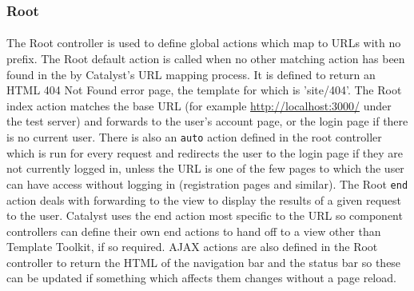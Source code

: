 \subsubsection{Root}
\label{sec:controller_root}

\paragraph{}
The Root controller is used to define global actions which map to URLs with no prefix. The Root default action is called when no other matching action has been found in the by Catalyst's URL mapping process. It is defined to return an HTML 404 Not Found error page, the template for which is 'site/404'. The Root index action matches the base URL (for example \url{http://localhost:3000/} under the test server) and forwards to the user's account page, or the login page if there is no current user. There is also an \texttt{auto} action defined in the root controller which is run for every request and redirects the user to the login page if they are not currently logged in, unless the URL is one of the few pages to which the user can have access without logging in (registration pages and similar). The Root \texttt{end} action deals with forwarding to the view to display the results of a given request to the user. Catalyst uses the end action most specific to the URL so component controllers can define their own end actions to hand off to a view other than Template Toolkit, if so required. AJAX actions are also defined in the Root controller to return the HTML of the navigation bar and the status bar so these can be updated if something which affects them changes without a page reload.